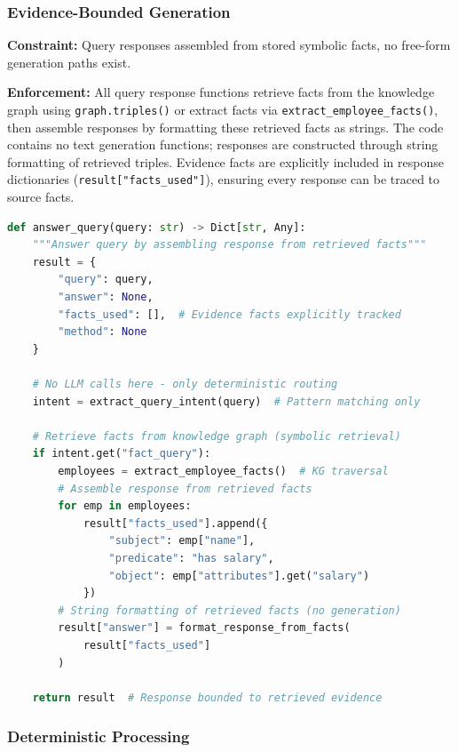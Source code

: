 \subsubsection{Evidence-Bounded Generation}

\textbf{Constraint:} Query responses assembled from stored symbolic facts, no free-form generation paths exist.

\textbf{Enforcement:} All query response functions retrieve facts from the knowledge graph using \texttt{graph.triples()} or extract facts via \texttt{extract\_employee\_facts()}, then assemble responses by formatting these retrieved facts as strings. The code contains no text generation functions; responses are constructed through string formatting of retrieved triples. Evidence facts are explicitly included in response dictionaries (\texttt{result["facts\_used"]}), ensuring every response can be traced to source facts.

\begin{lstlisting}[language=Python, caption=Evidence-bounded response assembly from retrieved symbolic facts]
def answer_query(query: str) -> Dict[str, Any]:
    """Answer query by assembling response from retrieved facts"""
    result = {
        "query": query,
        "answer": None,
        "facts_used": [],  # Evidence facts explicitly tracked
        "method": None
    }
    
    # No LLM calls here - only deterministic routing
    intent = extract_query_intent(query)  # Pattern matching only
    
    # Retrieve facts from knowledge graph (symbolic retrieval)
    if intent.get("fact_query"):
        employees = extract_employee_facts()  # KG traversal
        # Assemble response from retrieved facts
        for emp in employees:
            result["facts_used"].append({
                "subject": emp["name"],
                "predicate": "has salary",
                "object": emp["attributes"].get("salary")
            })
        # String formatting of retrieved facts (no generation)
        result["answer"] = format_response_from_facts(
            result["facts_used"]
        )
    
    return result  # Response bounded to retrieved evidence
\end{lstlisting}

\subsubsection{Deterministic Processing}

